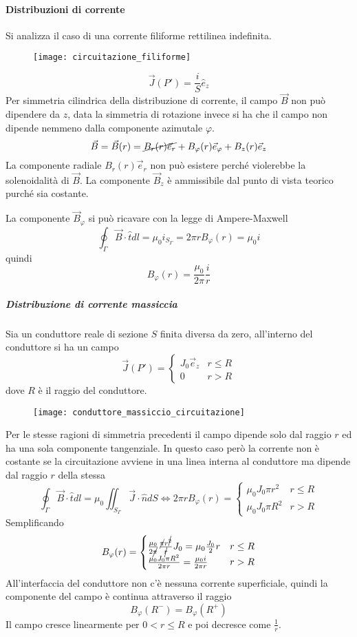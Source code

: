\paragraph{Distribuzioni di corrente}
Si analizza il caso di una corrente filiforme rettilinea indefinita.
\begin{figure}
\centering
\texttt{[image: circuitazione\_filiforme]}
\end{figure}
$$
\vec{J}(P') = \frac{i}{S}\hat{e}_z
$$
Per simmetria cilindrica della distribuzione di corrente, il campo $\vec{B}$ non può 
dipendere da $z$, data la simmetria di rotazione invece si ha che il campo non dipende 
nemmeno dalla componente azimutale $\varphi$.
$$
\vec{B} = \vec{B}(r) = \cancel{B_r(r)\vec{e}_r} + B_\varphi (r) \vec{e}_\varphi + B_z(r)\vec{e}_z
$$
La componente radiale $B_r(r)\vec{e}_r$ non può esistere perché violerebbe la solenoidalità
di $\vec{B}$.
La componente $\vec{B}_z$ è ammissibile dal punto di vista teorico purché sia costante.

La componente $\vec{B}_\varphi$ si può ricavare con la legge di Ampere-Maxwell
$$
\oint_\Gamma \vec{B}\cdot\hat{t}dl =\mu_0 i_{S_\Gamma} = 2 \pi r B_\varphi(r) = \mu_0 i 
$$
quindi
$$
B_\varphi(r) = \frac{\mu_0}{2 \pi}\frac{i}{r}
$$

\subparagraph{Distribuzione di corrente massiccia}
Sia un conduttore reale di sezione $S$ finita diversa da zero, all'interno del conduttore
si ha un campo 
$$
\vec{J}(P') = \begin{cases}
J_0 \vec{e}_z & r\leq R\\
0 & r > R
\end{cases}
$$
dove $R$ è il raggio del conduttore.
\begin{figure}[H]
\centering
\texttt{[image: conduttore\_massiccio\_circuitazione]}
\end{figure}
Per le stesse ragioni di simmetria precedenti il campo dipende solo dal raggio $r$ 
ed ha una sola componente tangenziale.
In questo caso però la corrente non è costante se la circuitazione avviene
in una linea interna al conduttore ma dipende dal raggio $r$ della stessa
$$
\oint_\Gamma \vec{B}\cdot\hat{t} dl = \mu_0 \iint_{S_\Gamma}\vec{J}\cdot\hat{n}dS \Leftrightarrow
2\pi r B_\varphi (r) = \begin{cases}
\mu_0 J_0 \pi r^2 & r \leq R \\
\mu_0 J_0 \pi R^2 & r > R
\end{cases}
$$
Semplificando
$$
B_\varphi(r) = \begin{cases}
\frac{\mu_0}{2\cancel{\pi}}\frac{\cancel{\pi}r^{\cancel{2}}}{\cancel{r}}J_0 = \mu_0\frac{J_0}{2}r & r \leq R \\
\frac{\mu_0 J_0 \pi R^2}{2 \pi r} = \frac{\mu_0 i}{2\pi r} & r>R
\end{cases}
$$
All'interfaccia del conduttore non c'è nessuna corrente superficiale, quindi 
la componente del campo è continua attraverso il raggio
$$
B_\varphi(R^-) = B_\varphi(R^+)
$$
Il campo cresce linearmente per $0 < r \leq R$ e poi decresce come $\frac{1}{r}$.

